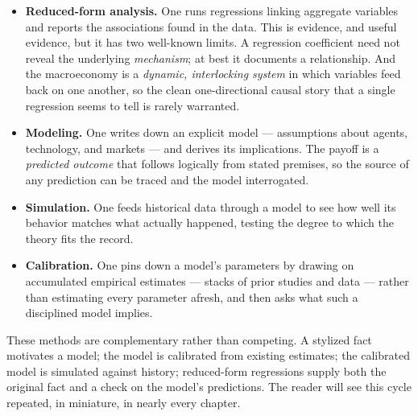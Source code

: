 \begin{itemize}
    \item \textbf{Reduced-form analysis.} One runs regressions linking aggregate variables and reports the associations found in the data. This is evidence, and useful evidence, but it has two well-known limits. A regression coefficient need not reveal the underlying \emph{mechanism}; at best it documents a relationship. And the macroeconomy is a \emph{dynamic, interlocking system} in which variables feed back on one another, so the clean one-directional causal story that a single regression seems to tell is rarely warranted.
    \item \textbf{Modeling.} One writes down an explicit model --- assumptions about agents, technology, and markets --- and derives its implications. The payoff is a \emph{predicted outcome} that follows logically from stated premises, so the source of any prediction can be traced and the model interrogated.
    \item \textbf{Simulation.} One feeds historical data through a model to see how well its behavior matches what actually happened, testing the degree to which the theory fits the record.
    \item \textbf{Calibration.} One pins down a model's parameters by drawing on accumulated empirical estimates --- stacks of prior studies and data --- rather than estimating every parameter afresh, and then asks what such a disciplined model implies.
\end{itemize}

These methods are complementary rather than competing. A stylized fact motivates a model; the model is calibrated from existing estimates; the calibrated model is simulated against history; reduced-form regressions supply both the original fact and a check on the model's predictions. The reader will see this cycle repeated, in miniature, in nearly every chapter.


